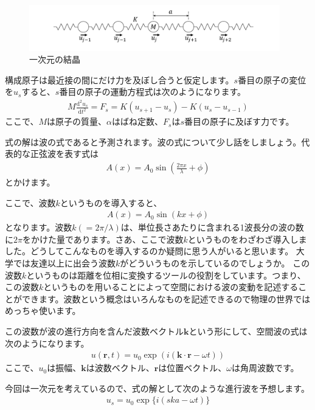 \documentclass[10pt,b5paper,papersize,dvipdfmx]{jsbook}
\begin{document}
\begin{figure}[htbp]
  \centering
  \includegraphics[height=2cm]{img/bane.pdf}  %
  \caption{一次元の結晶}
  \label{fig:bane}
\end{figure}
構成原子は最近接の間にだけ力を及ぼし合うと仮定します。$s$番目の原子の変位を$u_s$すると、$s$番目の原子の運動方程式は次のようになります。
\begin{align}
  M\frac{\mathrm{d}^2u_s}{\mathrm{d}t^2} = F_s = K (u_{s+1} - u_s) - K (u_s - u_{s-1})
  \label{eq:satom}
\end{align}
ここで、$M$は原子の質量、$\alpha$はばね定数、$F_s$は$s$番目の原子に及ぼす力です。\par
式の解は波の式であると予測されます。波の式について少し話をしましょう。代表的な正弦波を表す式は
\begin{align}
  A(x) = A_0 \sin \left(\frac{2\pi x}{\lambda} + \phi \right)
\end{align}
とかけます。\par
ここで、波数$k$というものを導入すると、
\begin{align}
  A(x) = A_0 \sin (kx + \phi)
\end{align}
となります。波数$k (= 2\pi/\lambda)$は、単位長さあたりに含まれる1波長分の波の数に$2\pi$をかけた量であります。さあ、ここで波数$k$というものをわざわざ導入しました。どうしてこんなものを導入するのか疑問に思う人がいると思います。
大学では友達以上に出会う波数$k$がどういうものを示しているのでしょうか。
この波数$k$というものは距離を位相に変換するツールの役割をしています。つまり、この波数$k$というものを用いることによって空間における波の変動を記述することができます。波数という概念はいろんなものを記述できるので物理の世界ではめっちゃ使います。\par
この波数が波の進行方向を含んだ波数ベクトル$\bm{k}$という形にして、空間波の式は次のようになります。
\begin{align}
  u(\bm{r},t) = u_0 \exp(i(\bm{k} \cdot \bm{r} - \omega t))
\end{align}
ここで、$u_0$は振幅、$\bm{k}$は波数ベクトル、$\bm{r}$は位置ベクトル、$\omega$は角周波数です。\par
今回は一次元を考えているので、式の解として次のような進行波を予想します。
\begin{align}
  u_s = u_0 \exp\{i(ska - \omega t)\}
\end{align}
\end{document}
